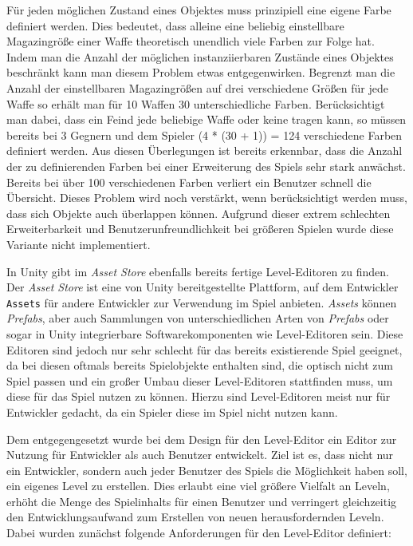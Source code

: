 Für jeden möglichen Zustand eines Objektes muss prinzipiell eine eigene Farbe definiert werden. Dies bedeutet, dass alleine eine beliebig einstellbare Magazingröße einer Waffe theoretisch unendlich viele Farben zur Folge hat. Indem man die Anzahl der möglichen instanziierbaren Zustände eines Objektes beschränkt kann man diesem Problem etwas entgegenwirken. Begrenzt man die Anzahl der einstellbaren Magazingrößen auf drei verschiedene Größen für jede Waffe so erhält man für 10 Waffen 30 unterschiedliche Farben. Berücksichtigt man dabei, dass ein Feind jede beliebige Waffe oder keine tragen kann, so müssen bereits bei 3 Gegnern und dem Spieler (4 * (30 + 1)) = 124 verschiedene Farben definiert werden. Aus diesen Überlegungen ist bereits erkennbar, dass die Anzahl der zu definierenden Farben bei einer Erweiterung des Spiels sehr stark anwächst. Bereits bei über 100 verschiedenen Farben verliert ein Benutzer schnell die Übersicht. Dieses Problem wird noch verstärkt, wenn berücksichtigt werden muss, dass sich Objekte auch überlappen können. Aufgrund dieser extrem schlechten Erweiterbarkeit und Benutzerunfreundlichkeit bei größeren Spielen wurde diese Variante nicht implementiert.


In Unity gibt im \textit{Asset Store} ebenfalls bereits fertige Level-Editoren zu finden. Der \textit{Asset Store} ist eine von Unity bereitgestellte Plattform, auf dem Entwickler \texttt{Assets} für andere Entwickler zur Verwendung im Spiel anbieten. \textit{Assets} können \textit{Prefabs}, aber auch Sammlungen von unterschiedlichen Arten von \textit{Prefabs} oder sogar in Unity integrierbare Softwarekomponenten wie Level-Editoren sein. Diese Editoren sind jedoch nur sehr schlecht für das bereits existierende Spiel geeignet, da bei diesen oftmals bereits Spielobjekte enthalten sind, die optisch nicht zum Spiel passen und ein großer Umbau dieser Level-Editoren stattfinden muss, um diese für das Spiel nutzen zu können. Hierzu sind Level-Editoren meist nur für Entwickler gedacht, da ein Spieler diese im Spiel nicht nutzen kann.

Dem entgegengesetzt wurde bei dem Design für den Level-Editor ein Editor zur Nutzung für Entwickler als auch Benutzer entwickelt. Ziel ist es, dass nicht nur ein Entwickler, sondern auch jeder Benutzer des Spiels die Möglichkeit haben soll, ein eigenes Level zu erstellen. Dies erlaubt eine viel größere Vielfalt an Leveln, erhöht die Menge des Spielinhalts für einen Benutzer und verringert gleichzeitig den Entwicklungsaufwand zum Erstellen von neuen herausfordernden Leveln. Dabei wurden zunächst folgende Anforderungen für den Level-Editor definiert:


